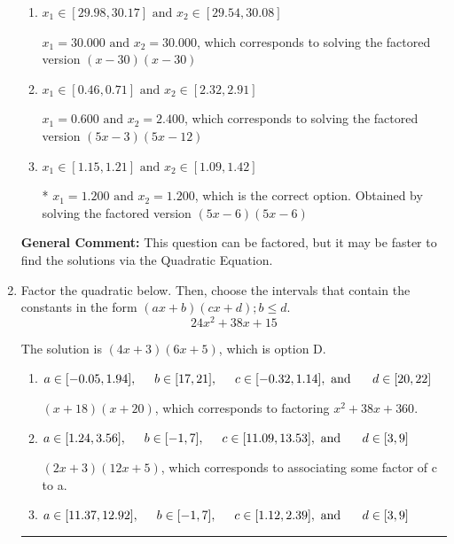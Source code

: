 \documentclass{extbook}[14pt]
\newcommand{\litem}[1]{\item #1

\rule{\textwidth}{0.4pt}}
\begin{document}
\begin{enumerate}
{\begin{enumerate}[label=\Alph*.]
$x_1 = 0.400 \text{ and } x_2 = 3.600$, which corresponds to solving the factored version $(5x -2)(5x -18)$
\item \( x_1 \in [29.98, 30.17] \text{ and } x_2 \in [29.54, 30.08] \)

$x_1 = 30.000 \text{ and } x_2 = 30.000$, which corresponds to solving the factored version $(x -30)(x -30)$
\item \( x_1 \in [0.46, 0.71] \text{ and } x_2 \in [2.32, 2.91] \)

$x_1 = 0.600 \text{ and } x_2 = 2.400$, which corresponds to solving the factored version $(5x -3)(5x -12)$
\item \( x_1 \in [1.15, 1.21] \text{ and } x_2 \in [1.09, 1.42] \)

* $x_1 = 1.200 \text{ and } x_2 = 1.200$, which is the correct option. Obtained by solving the factored version $(5x -6)(5x -6)$
\end{enumerate}

\textbf{General Comment:} This question can be factored, but it may be faster to find the solutions via the Quadratic Equation.
}
\litem{
Factor the quadratic below. Then, choose the intervals that contain the constants in the form $(ax+b)(cx+d); b \leq d.$
\[ 24x^{2} +38 x + 15 \]

The solution is \( (4x + 3)(6x + 5) \), which is option D.\begin{enumerate}[label=\Alph*.]
\item \( a \in [-0.05, 1.94], \hspace*{5mm} b \in [17, 21], \hspace*{5mm} c \in [-0.32, 1.14], \text{ and } \hspace*{5mm} d \in [20, 22] \)

 $(x + 18)(x + 20)$, which corresponds to factoring $x^{2} +38 x + 360$.
\item \( a \in [1.24, 3.56], \hspace*{5mm} b \in [-1, 7], \hspace*{5mm} c \in [11.09, 13.53], \text{ and } \hspace*{5mm} d \in [3, 9] \)

 $(2x + 3)(12x + 5)$, which corresponds to associating some factor of c to a.
\item \( a \in [11.37, 12.92], \hspace*{5mm} b \in [-1, 7], \hspace*{5mm} c \in [1.12, 2.39], \text{ and } \hspace*{5mm} d \in [3, 9] \)


\end{enumerate}}
\end{enumerate}
\end{document}
